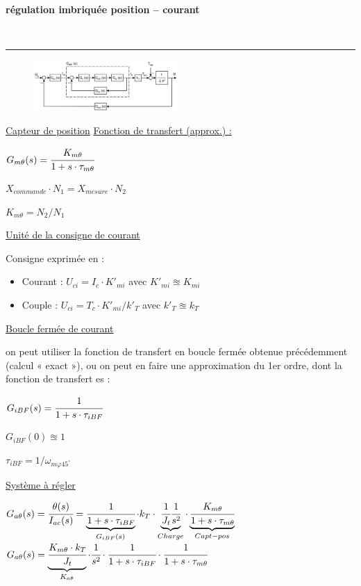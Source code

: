 \documentclass[	DIV=calc,%
							paper=a4,%
							fontsize=10pt,%
							twocolumn]{scrartcl} %
\newcounter{mycounter}
\newcommand{\formdesc}[1]{\large\textbf{#1} \addtocounter{mycounter}{1} \hfill \themycounter \\ \vspace{-3mm} \hrule \vspace{2mm}}
\newcommand{\formtitle}[1]{\large\underline{#1}}
\begin{document}
\formdesc{régulation imbriquée position – courant}
\begin{figure}[H]
    \begin{center}
        \includegraphics[width = 0.49\textwidth]{img/Regulation_courrant_pos.JPG}
    \end{center}
\end{figure}

\formtitle{Capteur de position}
\underline{Fonction de transfert  (approx.) :}

\vspace{3mm}
$G_{m\theta}(s) = \cfrac{K_{m\theta}}{1+s\cdot\tau_{m\theta}} $

$X_{commande} \cdot N_1 = X_{mesure} \cdot N_2$

$K_{m\theta} = N_2/N_1$

\underline{Unité de la consigne de courant}

Consigne exprimée en : 
\begin{itemize}
    \item Courant : $U_{ci} = I_c \cdot K'_{mi}$ avec $K'_{mi} \approxeq K_{mi}$
    \item Couple  : $U_{ci} = T_c \cdot K'_{mi}/k'_T$ avec $k'_T \approxeq k _T$
\end{itemize}


\underline{Boucle fermée de courant}

on peut utiliser la fonction de transfert en boucle fermée obtenue 
précédemment (calcul « exact »), ou on peut en faire une approximation du 1er ordre, dont la fonction de 
transfert es :

$G_{iBF}(s) = \cfrac{1}{1+s\cdot\tau_{iBF}} $

$G_{iBF}(0) \approxeq 1$

 $\tau_{iBF} = 1/ \omega_{m\varphi 45^\circ}$ 

\underline{Système à régler}

$G_{a\theta}(s) = \cfrac{\theta(s)}{I_{ac}(s)} = \underbrace{\cfrac{1}{1+s\cdot\tau_{iBF}}}_{G_{iBF}(s)}\cdot k_T \cdot \underbrace{\cfrac{1}{J_t}\cfrac{1}{s^2}}_{Charge} \cdot \underbrace{\cfrac{K_{m\theta}}{1+s\cdot\tau_{m\theta}}}_{Capt-pos} $ 
$G_{a\theta}(s) = \underbrace{\cfrac{K_{m\theta} \cdot k_T}{J_t}}_{K_{a\theta} }\cdot \cfrac{1}{s^2}\cdot \cfrac{1}{1+s\cdot\tau_{iBF}} \cdot \cfrac{1}{1+s\cdot\tau_{m\theta}}$
\end{document}
